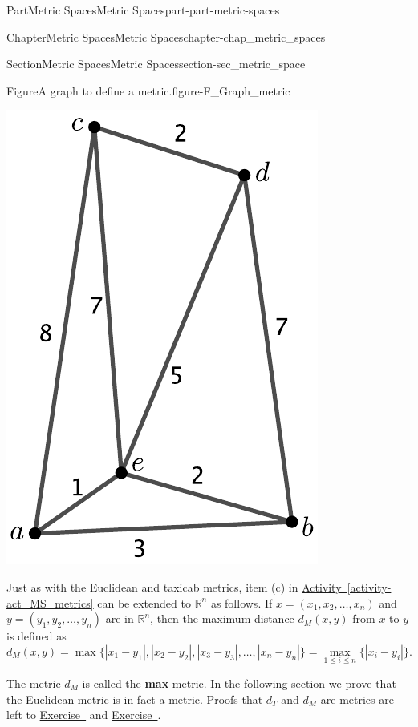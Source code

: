 \documentclass[oneside,10pt,]{book}
\newcommand{\xreffont}{\relax}
\newcommand{\terminology}[1]{\textbf{#1}}
\numberwithin{equation}{chapter}
\newcommand{\R}{\mathbb{R}}
\begin{document}
\begin{partptx}{Part}{Metric Spaces}{}{Metric Spaces}{}{}{part-part-metric-spaces}
\begin{chapterptx}{Chapter}{Metric Spaces}{}{Metric Spaces}{}{}{chapter-chap_metric_spaces}
\begin{sectionptx}{Section}{Metric Spaces}{}{Metric Spaces}{}{}{section-sec_metric_space}
\begin{figureptx}{Figure}{A graph to define a metric.}{figure-F_Graph_metric}{}
\begin{image}{0.35}{0.3}{0.35}{}
\includegraphics[width=\linewidth]{external/Graph_metric.pdf}
\end{image}%
\tcblower
\end{figureptx}%
Just as with the Euclidean and taxicab metrics, item (c) in \hyperref[activity-act_MS_metrics]{Activity~{\xreffont\ref{activity-act_MS_metrics}}} can be extended to \(\R^n\) as follows. If \(x = (x_1, x_2, \ldots,
x_n)\) and \(y = (y_1, y_2, \ldots,
y_n)\) are in \(\R^n\), then the maximum distance \(d_M(x,y)\) from \(x\) to \(y\) is defined as%
\begin{equation*}
d_M(x,y) = \max\{| x_1-y_1 |, | x_2-y_2 |, |x_3-y_3|, \ldots, |x_n-y_n| \} = \max_{1 \leq i \leq n} \{|x_i-y_i|\}\text{.}
\end{equation*}
%
\par
{} The metric \(d_M\) is called the \terminology{max} metric. In the following section we prove that the Euclidean metric is in fact a metric. Proofs that \(d_T\) and \(d_M\) are metrics are left to \hyperlink{exercise-ex_Taxicab}{Exercise~{\xreffont 5}} and \hyperlink{exercise-ex_Max}{Exercise~{\xreffont 6}}.%

\end{sectionptx}
\end{chapterptx}
\end{partptx}
\end{document}
